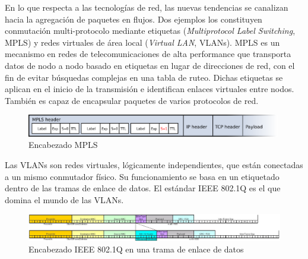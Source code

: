 
En lo que respecta a las tecnologías de red, las nuevas tendencias se canalizan hacia la agregación de paquetes en flujos. Dos ejemplos los constituyen conmutación multi-protocolo mediante etiquetas (\textit{Multiprotocol Label Switching}, MPLS) y redes virtuales  de área local (\textit{Virtual LAN}, VLANs). MPLS es un mecanismo en redes de telecomunicaciones de alta performance que transporta datos de nodo a nodo basado en etiquetas en lugar de direcciones de red, con el fin de evitar búsquedas complejas en una tabla de ruteo. Dichas etiquetas se aplican en el inicio de la transmisión e identifican enlaces virtuales entre nodos. También es capaz de encapsular paquetes de varios protocolos de red.

\begin{figure}[h]
  \centering
	\includegraphics[width=0.99\textwidth]{1-introduccion/graf/MPLS_packet.eps}
  \caption{Encabezado MPLS}
  \label{fig:flow}
\end{figure}
Las VLANs son redes virtuales, lógicamente independientes, que están conectadas a un mismo conmutador físico. Su funcionamiento se basa en un etiquetado dentro de las tramas de enlace de datos. El estándar IEEE 802.1Q es el que domina el mundo de las VLANs.


\begin{figure}[h]
  \centering
	\includegraphics[width=1.1\textwidth]{1-introduccion/graf/TCPIP_802.1Q.eps}
  \caption{Encabezado IEEE 802.1Q en una trama de enlace de datos}
  \label{fig:virt}
\end{figure}



